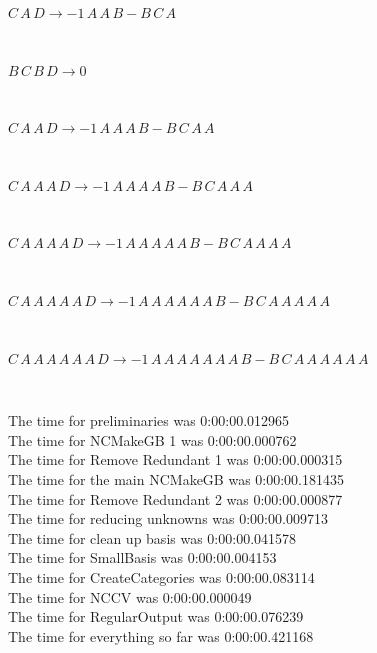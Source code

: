 \documentclass[rep10,leqno]{report}
\begin{document}
\begin{minipage}{6in}
$
C\,
 A\,
 D\rightarrow -1\,
 A\,
 A\,
 B - B\,
 C\,
 A
$
\end{minipage}\medskip \\
\begin{minipage}{6in}
$
B\,
 C\,
 B\,
 D\rightarrow 0
$
\end{minipage}\medskip \\
\begin{minipage}{6in}
$
C\,
 A\,
 A\,
 D\rightarrow -1\,
 A\,
 A\,
 A\,
 B - B\,
 C\,
 A\,
 A
$
\end{minipage}\medskip \\
\begin{minipage}{6in}
$
C\,
 A\,
 A\,
 A\,
 D\rightarrow -1\,
 A\,
 A\,
 A\,
 A\,
 B - B\,
 C\,
 A\,
 A\,
 A
$
\end{minipage}\medskip \\
\begin{minipage}{6in}
$
C\,
 A\,
 A\,
 A\,
 A\,
 D\rightarrow -1\,
 A\,
 A\,
 A\,
 A\,
 A\,
 B - B\,
 C\,
 A\,
 A\,
 A\,
 A
$
\end{minipage}\medskip \\
\begin{minipage}{6in}
$
C\,
 A\,
 A\,
 A\,
 A\,
 A\,
 D\rightarrow -1\,
 A\,
 A\,
 A\,
 A\,
 A\,
 A\,
 B - B\,
 C\,
 A\,
 A\,
 A\,
 A\,
 A
$
\end{minipage}\medskip \\
\begin{minipage}{6in}
$
C\,
 A\,
 A\,
 A\,
 A\,
 A\,
 A\,
 D\rightarrow -1\,
 A\,
 A\,
 A\,
 A\,
 A\,
 A\,
 A\,
 B - B\,
 C\,
 A\,
 A\,
 A\,
 A\,
 A\,
 A
$
\end{minipage}\\
\vspace{10pt}

\noindent
The time for preliminaries was 0:00:00.012965\\
The time for NCMakeGB 1 was 0:00:00.000762\\
The time for Remove Redundant 1 was 0:00:00.000315\\
The time for the main NCMakeGB was 0:00:00.181435\\
The time for Remove Redundant 2 was 0:00:00.000877\\
The time for reducing unknowns was 0:00:00.009713\\
The time for clean up basis was 0:00:00.041578\\
The time for SmallBasis was 0:00:00.004153\\
The time for CreateCategories was 0:00:00.083114\\
The time for NCCV was 0:00:00.000049\\
The time for RegularOutput was 0:00:00.076239\\
The time for everything so far was 0:00:00.421168\\
\end{document}
